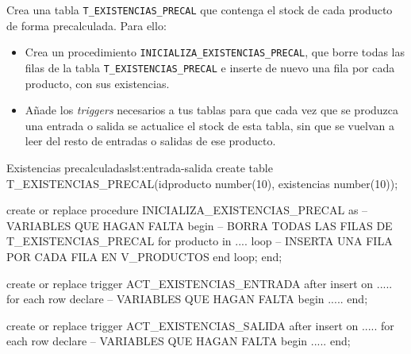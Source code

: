 \begin{homeworkProblem}

Crea una tabla \texttt{T\_EXISTENCIAS\_PRECAL} que contenga el stock de cada producto de forma precalculada. Para ello:
 
  \begin{itemize}
  \item Crea un procedimiento \texttt{INICIALIZA\_EXISTENCIAS\_PRECAL}, que borre todas las filas de la tabla \texttt{T\_EXISTENCIAS\_PRECAL} e inserte de nuevo una fila por cada producto, con sus existencias.
  \item Añade los \textit{triggers} necesarios a tus tablas para que cada vez que se produzca una entrada o salida se actualice el stock de esta tabla, sin que se vuelvan a leer del resto de entradas o salidas de ese producto.
  \end{itemize}

  
\begin{listadosql}{Existencias precalculadas}{lst:entrada-salida}
create table T_EXISTENCIAS_PRECAL(idproducto number(10), existencias number(10));

create or replace procedure INICIALIZA_EXISTENCIAS_PRECAL
as
  -- VARIABLES QUE HAGAN FALTA
begin
  -- BORRA TODAS LAS FILAS DE T_EXISTENCIAS_PRECAL
  for producto in .... loop
     -- INSERTA UNA FILA POR CADA FILA EN V_PRODUCTOS
  end loop;
end; 

create or replace trigger ACT_EXISTENCIAS_ENTRADA 
after insert on .....
for each row 
declare
  -- VARIABLES QUE HAGAN FALTA
begin
  .....
end;

create or replace trigger ACT_EXISTENCIAS_SALIDA
after insert on .....
for each row 
declare
  -- VARIABLES QUE HAGAN FALTA
begin
  .....
end;


  \end{listadosql}

\end{homeworkProblem}


